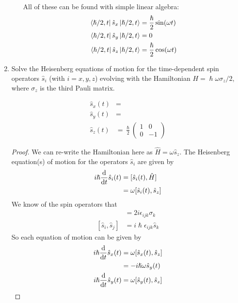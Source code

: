 \documentclass[a4paper]{article}
\begin{document}
\begin{enumerate}
\begin{itemize}
\begin{ans}
			All of these can be found with simple linear algebra:
			\begin{align*}
				\left\langle \hslash/2,t \right\rvert\hat{s}_x\left\lvert \hslash/2,t\right\rangle
					&= \frac{\hslash}{2}\sin(\omega t)\\
				\left\langle \hslash/2,t \right\rvert\hat{s}_y\left\lvert \hslash/2,t\right\rangle
					&= 0\\
				\left\langle \hslash/2,t \right\rvert\hat{s}_z\left\lvert \hslash/2,t\right\rangle
					&= \frac{\hslash}{2}\cos(\omega t)\\
			\end{align*}
		\end{ans}
	\end{itemize}

\item Solve the Heisenberg equations of motion for the time-dependent spin
	operators $\hat{s}_i$ (with $i=x,y,z$) evolving with the Hamiltonian
	$H=\hslash\omega\sigma_z/2$, where $\sigma_z$ is the third Pauli
	matrix.
	\begin{ans}
		\begin{align*}
			\hat{s}_x(t) &=\\
			\hat{s}_y(t) &=\\
			\hat{s}_z(t) &= \frac{\hslash}{2}\begin{pmatrix}
				1&0\\0&-1\end{pmatrix}
		\end{align*}
	\begin{proof}
		We can re-write the Hamiltonian here as
		$\hat{H} = \omega \hat{s}_z$. The Heisenberg equation(s) of
		motion for the operators $\hat{s}_i$ are given by
		\begin{align*}
			i\hslash\frac{\mathrm{d} }{\mathrm{d} t}\hat{s}_i(t) &=
				[\hat{s}_i(t),\hat{H}]\\
				&= \omega[\hat{s}_i(t),\hat{s}_z]
		\end{align*}
		We know of the spin operators that
		\begin{align*}
			[\sigma_i,\sigma_j] &= 2i\epsilon_{ijk}\sigma_k\\
			[\hat{s}_i,\hat{s}_j] &= i\hslash\epsilon_{ijk}
				\hat{s}_k
		\end{align*}
		So each equation of motion can be given by
		\begin{align*}
			i\hslash\der{}{t}\hat{s}_x(t) &= \omega
				[\hat{s}_x(t),\hat{s}_z]\\
				&=-i\hslash\omega\hat{s}_y(t)\\
			i\hslash\der{}{t}\hat{s}_y(t) &= \omega
				[\hat{s}_y(t),\hat{s}_z]\\

\end{align*}
\end{proof}
\end{ans}
\end{enumerate}
\end{document}

